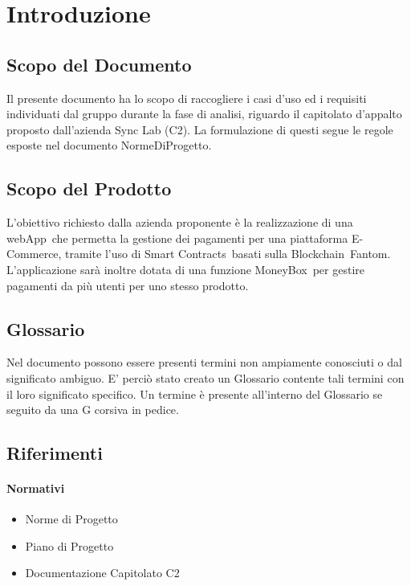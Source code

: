 \section{Introduzione}

\subsection{Scopo del Documento}
Il presente documento ha lo scopo di raccogliere i casi d'uso ed i requisiti individuati dal gruppo
durante la fase di analisi, riguardo il capitolato d'appalto proposto dall'azienda Sync Lab (C2). La formulazione di questi segue le regole esposte nel documento
NormeDiProgetto.

\subsection{Scopo del Prodotto}
L'obiettivo richiesto dalla azienda proponente è la realizzazione di una webApp\glo\ che permetta la gestione dei pagamenti per una piattaforma E-Commerce, tramite l'uso di Smart Contracts\glo\ basati sulla Blockchain\glo\ Fantom\glo.
L'applicazione sarà inoltre dotata di una funzione MoneyBox\glo\ per gestire pagamenti da più utenti per uno stesso prodotto.

\subsection{Glossario}
Nel documento possono essere presenti termini non ampiamente conosciuti o dal significato ambiguo. E' perciò stato creato
un Glossario contente tali termini con il loro significato specifico. Un termine è presente
all’interno del Glossario se seguito da una G corsiva in pedice.

\subsection{Riferimenti}

\paragraph{Normativi}
\begin{itemize}
    \item Norme di Progetto
    \item Piano di Progetto
    \item Documentazione Capitolato C2
\end{itemize}

